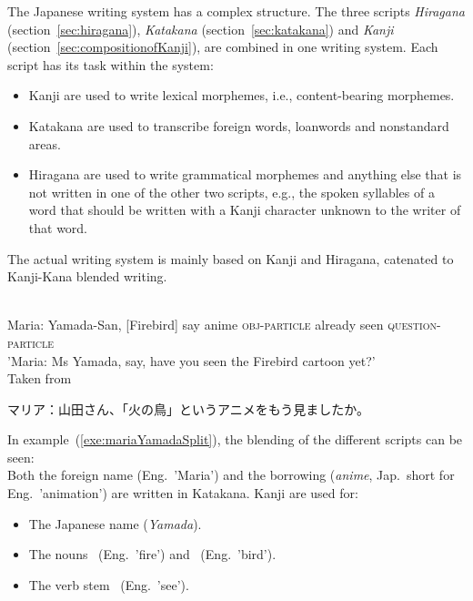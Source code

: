 The Japanese writing system has a complex structure. The three scripts 
\emph{Hiragana} (section~\ref{sec:hiragana}),
\emph{Katakana} (section~\ref{sec:katakana}) and
\emph{Kanji} (section~\ref{sec:compositionofKanji}),
are combined in one writing system. Each script has its task within the system:
\begin{itemize}

  \item Kanji are used to write lexical morphemes, i.e., content-bearing morphemes.

  \item Katakana are used to transcribe foreign words, loanwords and 
        nonstandard areas.

  \item Hiragana are used to write grammatical morphemes and anything else that
        is not written in one of the other two scripts, e.g., the spoken syllables
        of a word that should be written with a Kanji character unknown to the 
        writer of that word.
\end{itemize}
The actual writing system is mainly based on Kanji and Hiragana, catenated to
Kanji-Kana blended writing.
\begin{exe}
\ex\label{exe:mariaYamada}
\begin{xlist}
\ex \label{exe:mariaYamadaSplit}
\gll 
  \\
 Maria: Yamada-San, [Firebird] say anime \textsc{obj-particle} already seen \textsc{question-particle} \\
\trans 'Maria: Ms Yamada, say, have you seen the Firebird cartoon yet?' \\
Taken from~
\ex\label{exe:mariaYamadaFull}
 \begin{CJK} 
  マリア：山田さん、「火の鳥」というアニメをもう見ましたか。
 \end{CJK}
\end{xlist}
\end{exe}
In example~(\ref{exe:mariaYamadaSplit}), the blending of the different scripts 
can be seen:\\
Both the foreign name   (Eng.~'Maria') and the borrowing 
 (\emph{anime}, Jap.~short for Eng.~'animation') are written in 
Katakana. Kanji are used for:
\begin{itemize}
\item The Japanese name  (\emph{Yamada}).
\item The nouns ~(Eng.~'fire') and 
      ~(Eng.~'bird').
\item The verb stem ~(Eng.~'see').
\end{itemize}
